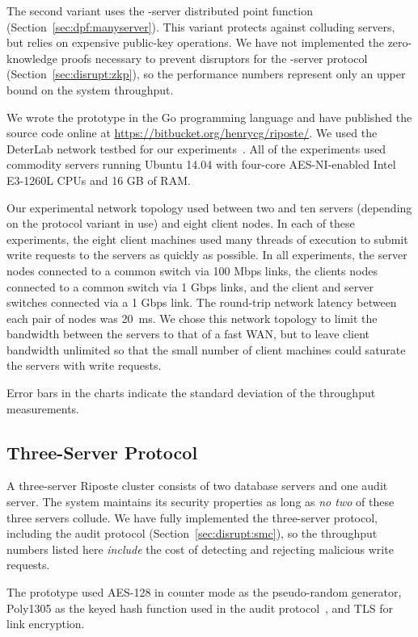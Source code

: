 \documentclass[10pt,twocolumn]{article}
\newcommand{\name}{Riposte\xspace}
\begin{document}
The second variant uses the -server distributed
point function (Section~\ref{sec:dpf:manyserver}).
This variant protects against  colluding servers,
but relies on expensive public-key operations.
We have not implemented the zero-knowledge proofs
necessary to prevent disruptors for the -server
protocol (Section~\ref{sec:disrupt:zkp}), so the
performance numbers represent only an upper bound on the
system throughput.

We wrote the prototype in the Go programming language
and have published the source code online at
\url{https://bitbucket.org/henrycg/riposte/}.
We used the DeterLab network 
testbed for our experiments~\cite{mirkovic2012teaching}.
All of the experiments used commodity servers running Ubuntu 14.04
with four-core AES-NI-enabled Intel E3-1260L CPUs 
and 16 GB of RAM.

Our experimental network topology used between
two and ten servers (depending on the protocol variant in use)
and eight client nodes.
In each of these experiments, the eight client machines
used many threads of execution to submit
write requests to the servers as quickly as possible.
In all experiments, the server nodes
connected to a common switch via 100 Mbps links,
the clients nodes connected to a common switch via 1 Gbps links,
and the client and server switches connected via a 1 Gbps link.
The round-trip network latency between each pair of nodes was 20~ms.
We chose this network topology to limit
the bandwidth between the servers to that of a fast WAN, but
to leave client bandwidth unlimited so that the small number
of client machines could saturate the servers with
write requests.

Error bars in the charts indicate the standard
deviation of the throughput measurements.

\subsection{Three-Server Protocol}

A three-server \name cluster consists of
two database servers and one audit server.
The system maintains its security properties as long
as {\em no two} of these three servers collude.
We have fully implemented the three-server protocol,
including the audit protocol (Section~\ref{sec:disrupt:smc}),
so the throughput numbers listed here {\em include} 
the cost of detecting and rejecting malicious write requests.

The prototype used AES-128 in counter mode as the pseudo-random
generator, Poly1305 as the keyed hash function 
used in the audit protocol~\cite{bernstein2005poly},
and TLS for link encryption.
\end{document}
